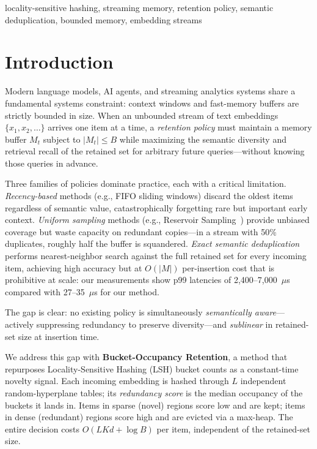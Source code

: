 \documentclass[conference]{IEEEtran}
\begin{document}
\begin{IEEEkeywords}
locality-sensitive hashing, streaming memory, retention policy, semantic
deduplication, bounded memory, embedding streams
\end{IEEEkeywords}

\section{Introduction}

Modern language models, AI agents, and streaming analytics systems share
a fundamental systems constraint: context windows and fast-memory
buffers are strictly bounded in size. When an unbounded stream of text
embeddings $\{x_1, x_2, \ldots\}$ arrives one item at a time, a
\emph{retention policy} must maintain a memory buffer $M_t$ subject to
$|M_t| \le B$ while maximizing the semantic diversity and retrieval
recall of the retained set for arbitrary future queries---without
knowing those queries in advance.

Three families of policies dominate practice, each with a critical
limitation. \textit{Recency-based} methods (e.g., FIFO sliding windows)
discard the oldest items regardless of semantic value, catastrophically
forgetting rare but important early context. \textit{Uniform sampling}
methods (e.g., Reservoir Sampling~\cite{b10}) provide unbiased coverage
but waste capacity on redundant copies---in a stream with 50\%
duplicates, roughly half the buffer is squandered. \textit{Exact
semantic deduplication}~\cite{b11} performs nearest-neighbor search
against the full retained set for every incoming item, achieving high
accuracy but at $O(|M|)$ per-insertion cost that is prohibitive at
scale: our measurements show p99 latencies of 2,400--7,000~$\mu$s
compared with 27--35~$\mu$s for our method.

The gap is clear: no existing policy is simultaneously
\emph{semantically aware}---actively suppressing redundancy to preserve
diversity---and \emph{sublinear} in retained-set size at insertion time.

We address this gap with \textbf{Bucket-Occupancy Retention}, a method
that repurposes Locality-Sensitive Hashing (LSH) bucket counts as a
constant-time novelty signal. Each incoming embedding is hashed through
$L$ independent random-hyperplane tables; its \emph{redundancy score}
is the median occupancy of the buckets it lands in. Items in sparse
(novel) regions score low and are kept; items in dense (redundant)
regions score high and are evicted via a max-heap. The entire decision
costs $O(LKd + \log B)$ per item, independent of the retained-set size.
\end{document}

